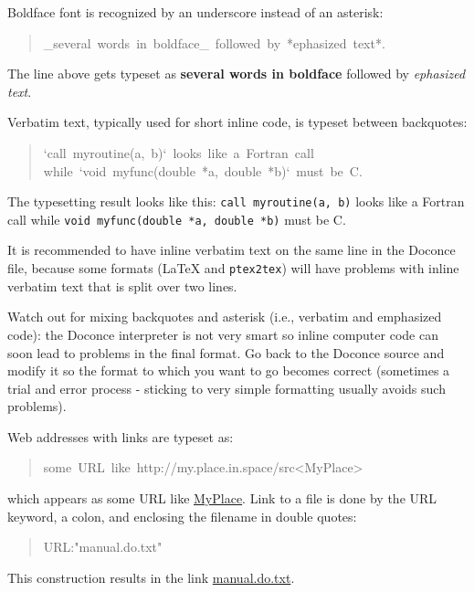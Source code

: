 \documentclass[a4paper,english]{article}
\begin{document}
Boldface font is recognized by an underscore instead of an asterisk:
%
\begin{quote}{\ttfamily \raggedright \noindent
\_several~words~in~boldface\_~followed~by~*ephasized~text*.
}
\end{quote}

The line above gets typeset as
\textbf{several words in boldface} followed by \emph{ephasized text}.

Verbatim text, typically used for short inline code,
is typeset between backquotes:
%
\begin{quote}{\ttfamily \raggedright \noindent
`call~myroutine(a,~b)`~looks~like~a~Fortran~call\\
while~`void~myfunc(double~*a,~double~*b)`~must~be~C.
}
\end{quote}

The typesetting result looks like this:
\texttt{call myroutine(a, b)} looks like a Fortran call
while \texttt{void myfunc(double *a, double *b)} must be C.

It is recommended to have inline verbatim text on the same line in
the Doconce file, because some formats (LaTeX and \texttt{ptex2tex}) will have
problems with inline verbatim text that is split over two lines.

Watch out for mixing backquotes and asterisk (i.e., verbatim and
emphasized code): the Doconce interpreter is not very smart so inline
computer code can soon lead to problems in the final format. Go back to the
Doconce source and modify it so the format to which you want to go
becomes correct (sometimes a trial and error process - sticking to
very simple formatting usually avoids such problems).

Web addresses with links are typeset as:
%
\begin{quote}{\ttfamily \raggedright \noindent
some~URL~like~http://my.place.in.space/src<MyPlace>
}
\end{quote}

which appears as some URL like \href{http://my.place.in.space/src}{MyPlace}.
Link to a file is done by the URL keyword, a colon, and enclosing the
filename in double quotes:
%
\begin{quote}{\ttfamily \raggedright \noindent
URL:"manual.do.txt"
}
\end{quote}

This construction results in the link \url{manual.do.txt}.
\end{document}
